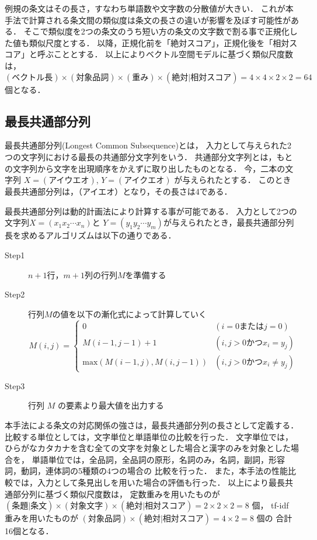 \documentclass[japanese]{jnlp_1.4}
\begin{document}
例規の条文はその長さ，すなわち単語数や文字数の分散値が大きい．
これが本手法で計算される条文間の類似度は条文の長さの違いが影響を及ぼす可能性がある．
そこで類似度を2つの条文のうち短い方の条文の文字数で割る事で正規化した値も類似尺度とする．
以降，正規化前を「絶対スコア」，正規化後を「相対スコア」と呼ぶこととする．
以上によりベクトル空間モデルに基づく類似尺度数は，
$(\text{ベクトル長}) \times (\text{対象品詞}) \times (\text{重み}) \times (\text{絶対}|\text{相対スコア}) = 4 \times 4 \times 2 \times 2 = 64$ 個となる．



\subsection{最長共通部分列}
\label{subsec:LCS}

最長共通部分列(Longest Common Subsequence)とは，
入力として与えられた2つの文字列における最長の共通部分文字列をいう\cite{Maier:1978:CPS:322063.322075}．
共通部分文字列とは，もとの文字列から文字を出現順序をかえずに取り出したものとなる．
今，二本の文字列 $X=(\text{アイウエオ})$, $Y=(\text{アイクエオ})$ が与えられたとする．
このとき最長共通部分列は，（アイエオ）となり，その長さは4である．

最長共通部分列は動的計画法により計算する事が可能である．
入力として2つの文字列$X=(x_1x_2\cdots x_n)$と
$Y=(y_1y_2\cdots y_m)$が与えられたとき，最長共通部分列長を求めるアルゴリズムは以下の通りである．

\begin{description}
\item[Step1] $n+1$行，$m+1$列の行列$M$を準備する
\item[Step2] 行列$M$の値を以下の漸化式によって計算していく
\begin{equation}
M(i,j) = \begin{cases}
0 & ( i=0\text{または} j=0 )\\
M(i-1,j-1) +1  & ( i,j>0\text{かつ} x_i=y_j )  \\
\text{max}(M(i-1,j), M(i,j-1)) & ( i,j>0 \text{かつ} x_i \neq y_j ) \nonumber
\end{cases}
\end{equation}
\item[Step3]行列 $M$ の要素より最大値を出力する
\end{description}

本手法による条文の対応関係の強さは，最長共通部分列の長さとして定義する．
比較する単位としては，文字単位と単語単位の比較を行った．
文字単位では，ひらがなカタカナを含む全ての文字を対象とした場合と漢字のみを対象とした場合を，
単語単位では，全品詞，全品詞の原形，名詞のみ，名詞，副詞，形容詞，動詞，連体詞の5種類の4つの場合の
比較を行った．
また，本手法の性能比較では，入力として条見出しを用いた場合の評価も行った．
以上により最長共通部分列に基づく類似尺度数は，
定数重みを用いたものが $(\text{条題}|\text{条文}) \times (\text{対象文字}) \times  (\text{絶対}|\text{相対スコア}) = 2\times 2\times 2= 8$ 個，
tf-idf 重みを用いたものが $(\text{対象品詞}) \times (\text{絶対}|\text{相対スコア}) = 4 \times 2= 8$ 個の
合計16個となる．
\end{document}
